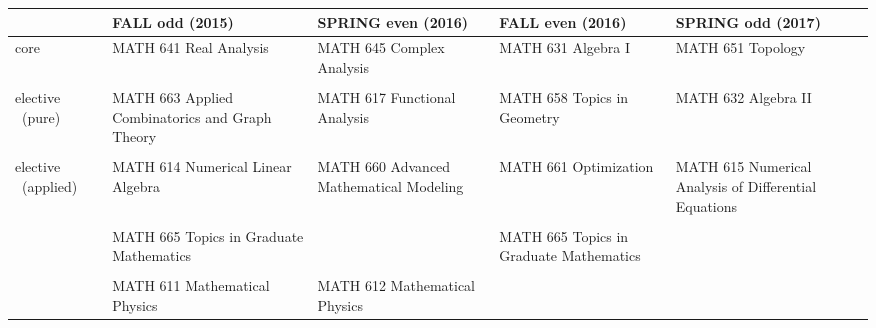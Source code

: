 \documentclass[12pt]{report}
\begin{document}
\pagestyle{empty}

\small
\begin{center}
\begin{tabular}{| p{1.6cm} || p{4.0cm} | p{4.0cm} | p{4.0cm} | p{4.0cm} |}

\hline
& \textbf{FALL odd (2015)} & \textbf{SPRING even (2016)} & \textbf{FALL even (2016)} & \textbf{SPRING odd (2017)} \\
\hline\hline
core & MATH 641 Real Analysis & MATH 645 Complex Analysis & MATH 631 Algebra I & MATH 651 Topology \\
&  &&&\\
\hline
elective 
~(pure) & MATH 663 Applied Combinatorics and Graph Theory & MATH 617 Functional Analysis & MATH 658 Topics in Geometry & MATH 632 Algebra II \\
&  &&  & \\
\hline
elective 
~(applied) & MATH 614 Numerical Linear Algebra & MATH 660 Advanced Mathematical Modeling & MATH 661 Optimization & MATH 615 Numerical Analysis of Differential Equations \\
&  &&  & \\
\hline
& MATH 665 Topics in Graduate Mathematics && MATH 665 Topics in Graduate Mathematics&\\
&  &&  &\\
\hline
& MATH 611 Mathematical Physics & MATH 612 Mathematical Physics&& \\
\hline
\end{tabular}
\end{center}
\end{document}
